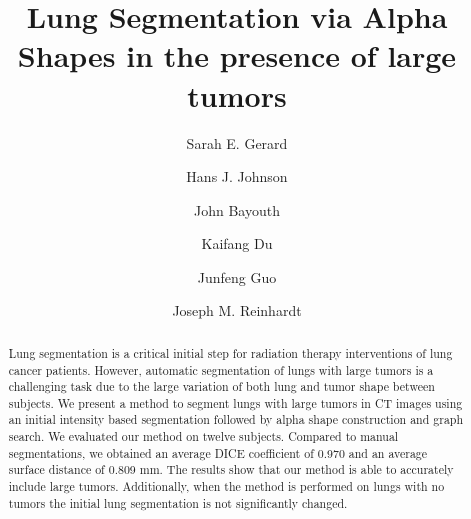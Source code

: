 \documentclass{llncs}
\begin{document}
%
\frontmatter          %
%
\pagestyle{headings}  %
%

%
\tableofcontents
%
\listoftodos

\mainmatter              %
%
\title{Lung Segmentation via Alpha Shapes in the presence of large tumors}
%
%
\author{Sarah E. Gerard \and Hans J. Johnson
\and John Bayouth \and Kaifang Du \and Junfeng Guo \and Joseph M. Reinhardt}
%
%
%


\maketitle              %

\begin{abstract}
Lung segmentation is a critical initial step for radiation therapy interventions of lung cancer patients. However, automatic segmentation of lungs with large tumors is a challenging task due to the large variation of both lung and tumor shape between subjects. We present a method to segment lungs with large tumors in CT images using an initial intensity based segmentation followed by alpha shape construction and graph search. We evaluated our method on twelve subjects. Compared to manual segmentations, we obtained an average DICE coefficient of 0.970 and an average surface distance of 0.809 mm. The results show that our method is able to accurately include large tumors. Additionally, when the method is performed on lungs with no tumors the initial lung segmentation is not significantly changed. 

\end{abstract}
%
\end{document}

